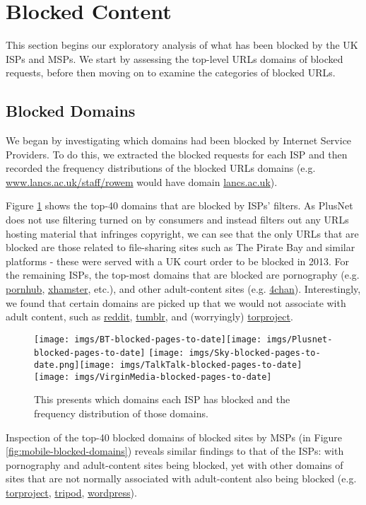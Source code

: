 \documentclass{bmcart}
\begin{document}
\section*{Blocked Content}
This section begins our exploratory analysis of what has been blocked by the UK ISPs and MSPs.
We start by assessing the top-level URLs domains of blocked requests, before then moving on to examine the categories of blocked URLs.

\subsection*{Blocked Domains}
We began by investigating which domains had been blocked by Internet Service Providers.
To do this, we extracted the blocked requests for each ISP and then recorded the frequency distributions of the blocked URLs domains (e.g. \url{www.lancs.ac.uk/staff/rowem} would have domain \url{lancs.ac.uk}).

Figure \ref{fig:broadband-blocked-domains} shows the top-40 domains that are blocked by ISPs' filters. 
As PlusNet does not use filtering turned on by consumers and instead filters out any URLs hosting material that infringes copyright, we can see that the only URLs that are blocked are those related to file-sharing sites such as The Pirate Bay and similar platforms - these were served with a UK court order to be blocked in 2013.
For the remaining ISPs, the top-most domains that are blocked are pornography (e.g. \url{pornhub}, \url{xhamster}, etc.), and other adult-content sites (e.g. \url{4chan}).
Interestingly, we found that certain domains are picked up that we would not associate with adult content, such as \url{reddit}, \url{tumblr}, and (worryingly) \url{torproject}.

\begin{figure}[h!]
\caption{ This presents which domains each ISP has blocked and the frequency distribution of those domains.}
\texttt{[image: imgs/BT-blocked-pages-to-date]}\texttt{[image: imgs/Plusnet-blocked-pages-to-date]}
\texttt{[image: imgs/Sky-blocked-pages-to-date.png]}\texttt{[image: imgs/TalkTalk-blocked-pages-to-date]}
\texttt{[image: imgs/VirginMedia-blocked-pages-to-date]}
\label{fig:broadband-blocked-domains}
\end{figure}

Inspection of the top-40 blocked domains of blocked sites by MSPs (in Figure \ref{fig:mobile-blocked-domains}) reveals similar findings to that of the ISPs: with pornography and adult-content sites being blocked, yet with other domains of sites that are not normally associated with adult-content also being blocked (e.g. \url{torproject}, \url{tripod}, \url{wordpress}).
\end{document}
